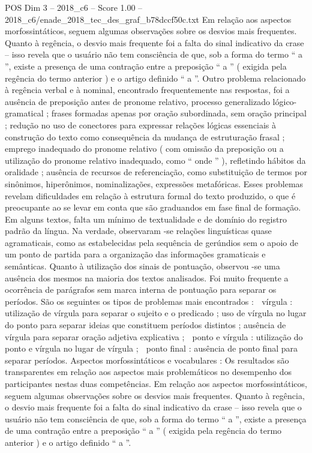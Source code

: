 \begin{textsample}{POS Dim 3 – 2018\_c6 – Score 1.00 – 2018\_c6/enade\_2018\_tec\_des\_graf\_b78dccf50c.txt}
Em relação aos aspectos morfossintáticos, seguem algumas observações sobre os desvios mais frequentes.
Quanto à regência, o desvio mais frequente foi a falta do sinal indicativo da crase – isso revela que o usuário não tem consciência de que, sob a forma do termo “ a ”, existe a presença de uma contração entre a preposição “ a ” ( exigida pela regência do termo anterior ) e o artigo definido “ a ”.
Outro problema relacionado à regência verbal e à nominal, encontrado frequentemente nas respostas, foi a ausência de preposição antes de pronome relativo, processo generalizado lógico-gramatical ; frases formadas apenas por oração subordinada, sem oração principal ; redução no uso de conectores para expressar relações lógicas essenciais à construção do texto como consequência da mudança de estruturação frasal ; emprego inadequado do pronome relativo ( com omissão da preposição ou a utilização do pronome relativo inadequado, como “ onde ” ), refletindo hábitos da oralidade ; ausência de recursos de referenciação, como substituição de termos por sinônimos, hiperônimos, nominalizações, expressões metafóricas.
Esses problemas revelam dificuldades em relação à estrutura formal do texto produzido, o que é preocupante ao se levar em conta que são graduandos em fase final de formação.
Em alguns textos, falta um mínimo de textualidade e de domínio do registro padrão da língua.
Na verdade, observaram -se relações linguísticas quase agramaticais, como as estabelecidas pela sequência de gerúndios sem o apoio de um ponto de partida para a organização das informações gramaticais e semânticas.
Quanto à utilização dos sinais de pontuação, observou -se uma ausência dos mesmos na maioria dos textos analisados.
Foi muito frequente a ocorrência de parágrafos sem marca interna de pontuação para separar os períodos.
São os seguintes os tipos de problemas mais encontrados :  vírgula : utilização de vírgula para separar o sujeito e o predicado ; uso de vírgula no lugar do ponto para separar ideias que constituem períodos distintos ; ausência de vírgula para separar oração adjetiva explicativa ;  ponto e vírgula : utilização do ponto e vírgula no lugar de vírgula ;  ponto final : ausência de ponto final para separar períodos.
Aspectos morfossintáticos e vocabulares : Os resultados são transparentes em relação aos aspectos mais problemáticos no desempenho dos participantes nestas duas competências.
Em relação aos aspectos morfossintáticos, seguem algumas observações sobre os desvios mais frequentes.
Quanto à regência, o desvio mais frequente foi a falta do sinal indicativo da crase – isso revela que o usuário não tem consciência de que, sob a forma do termo “ a ”, existe a presença de uma contração entre a preposição “ a ” ( exigida pela regência do termo anterior ) e o artigo definido “ a ”.

\end{textsample}
